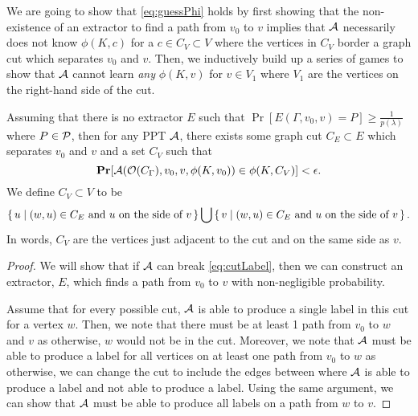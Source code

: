 We are going to show that \cref{eq:guessPhi} holds by first showing that
the non-existence of an extractor to find a path from $v_0$ to $v$ implies that $\mathcal{A}$
necessarily does not know $\phi(K, c)$ for a $c \in C_V \subset V$ where the vertices in $C_V$ border 
a graph cut which separates $v_0$ and $v$. Then, we inductively build up a series of games to show that
$\mathcal{A}$ cannot learn \emph{any} $\phi(K, v)$ for $v \in V_1$ where $V_1$ are the vertices on the right-hand side of the cut.

\begin{lemma}
	\label{lemma:cutBaseCase}
	Assuming that there is no extractor $E$ such that $\Pr[E(\Gamma, v_0, v) = P] \geq \frac{1}{p(\lambda)}$
	where $P \in \mathcal{P}$, then for any PPT $\mathcal{A}$, there exists some graph cut 
	$C_E \subset E$ which separates $v_0$ and $v$ and a set $C_V$ such that
	\begin{equation}
		\label{eq:cutLabel}
		\operatorname*{\mathbf{Pr}}[\mathcal{A}(\mathcal{O}(C_\Gamma), v_0, v, \phi(K, v_0)) \in \phi(K, C_V)] < \epsilon.
	\end{equation}
		We define $C_V \subset V$ to be
	\begin{equation*}
		\set{ u \mid (w, u) \in C_E \text{ and } u \text { on the side of } v} \bigcup \set{ v \mid (w, u) \in C_E \text{ and } u \text { on the side of } v}.
	\end{equation*}
	In words, $C_V$ are the vertices just adjacent to the cut and on the same side as $v$.
	\begin{proof}
		We will show that if $\mathcal{A}$ can break \cref{eq:cutLabel}, then we can construct an extractor,
		$E$, which finds a path from $v_0$ to $v$ with non-negligible probability.

		Assume that for every possible cut, $\mathcal{A}$ is able to produce a single label in this cut for a vertex $w$.
		Then, we note that there must be at least 1 path from $v_0$ to $w$ and $v$ as otherwise, $w$ would not be in the cut.
		Moreover, we note that $\mathcal{A}$ must be able to produce a label for all vertices on at least one path
		from $v_0$ to $w$ as otherwise, we can change the cut to include the edges between where
		$\mathcal{A}$ is able to produce a label and not able to produce a label. Using the same argument,
		we can show that $\mathcal{A}$ must be able to produce all labels on a path from $w$ to $v$.


\end{proof}
\end{lemma}
